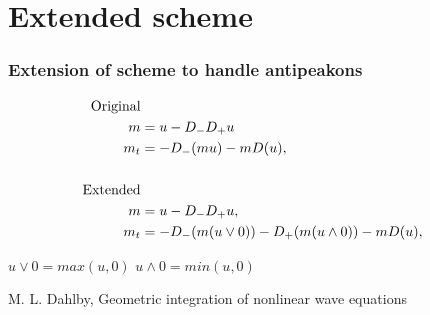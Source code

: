 \documentclass{beamer}
\begin{document}
\section*{Extended scheme}
\begin{frame}
\frametitle{Extension of scheme to handle antipeakons}
\begin{align*}
\text{Original} \\
m &= u - D_- D_+ u \notag \\
m_t &=- D_- ( m u ) - m D ( u ), \\ \\
\text{Extended} \\
m &= u - D_{-}D_{+}u, \notag \\ 
m_t &= -D_{-}(m(u \vee 0)) -D_{+}(m(u \wedge 0)) - mD(u), 
\end{align*}

$u \vee 0 = max(u, 0)$
$u \wedge 0 = min(u, 0) $

\vspace{1cm}
\tiny{M. L. Dahlby, Geometric integration of nonlinear
wave equations}
\end{frame}
\end{document}
